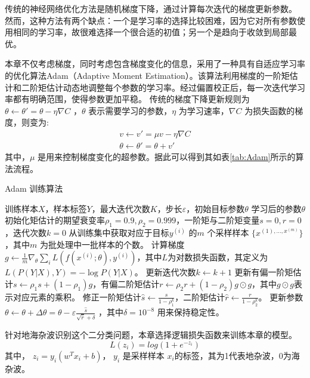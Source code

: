 传统的神经网络优化方法是随机梯度下降，通过计算每次迭代的梯度更新参数。
然而，这种方法有两个缺点：一个是学习率的选择比较困难，因为它对所有参数使用相同的学习率，故很难选择一个很合适的初值；另一个是趋向于收敛到局部最优。

本章不仅考虑梯度，同时考虑包含梯度变化的信息，采用了一种具有自适应学习率的优化算法Adam（Adaptive Moment Estimation）。该算法利用梯度的一阶矩估计和二阶矩估计动态地调整每个参数的学习率。经过偏置校正后，每一次迭代学习率都有明确范围，使得参数更加平稳。
传统的梯度下降更新规则为$\theta \leftarrow \theta'=\theta-\eta\nabla C$ ，$\theta$ 表示需要学习的参数，$\eta$ 为学习速率，$\nabla C$ 为损失函数的梯度，则变为:
\begin{align}
	v\leftarrow v'=\mu v - \eta \nabla C \\
	\theta \leftarrow \theta' = \theta +v'
\end{align}
其中，$\mu$ 是用来控制梯度变化的超参数。据此可以得到其如表\ref{tab:Adam}所示的算法流程。

\begin{algorithm}[hbt]
	\caption{Adam 训练算法}
	\label{tab:Adam}
	\begin{algorithmic}[1] %
		\Require 训练样本$X$，样本标签$Y$，最大迭代次数$K$，步长$\varepsilon$，初始目标参数$\theta$
		\Ensure 学习后的参数$\theta$
		\State 初始化矩估计的期望衰变率$\rho_1=0.9,\rho_2=0.999$，一阶矩与二阶矩变量$s=0,r=0$，迭代次数$k=0$
			\State 从训练集中获取对应于目标$y^{(i)}$ 的$m$ 个采样样本 $\{x^{(1),\dots,x^{(m)}}\}$ ，其中$m$ 为批处理中一批样本的个数。
			\label{line:start}
			\State 计算梯度$g \leftarrow \frac{1}{m} \nabla_{\theta} \sum_i L(f(x^{(i)};\theta), y^{(i)}) $，其中$L$为对数损失函数，其定义为$L(P(Y|X),Y) = - \log P(Y|X) $。
			\State 更新迭代次数$k \leftarrow k+1 $
			\State 更新有偏一阶矩估计$s \leftarrow \rho_1 s + (1 - \rho_1) g $，有偏二阶矩估计$r \leftarrow \rho_2 r + (1-\rho_2) g \odot g $，其中$ g \odot g $表示对应元素的乘积。
			\State 修正一阶矩估计$\hat{s} \leftarrow \frac{s}{1-\rho^k_1} $，二阶矩估计$\hat{r} \leftarrow \frac{r}{1-\rho^k_2} $。
			\State 更新参数 $\theta \leftarrow \theta + \Delta \theta = \theta - \varepsilon \frac{\hat{s}}{\sqrt{\hat{r}} + \delta} $
			，其中$\delta = 10^{-8} $
			用来保持稳定性。
		\EndWhile
	\end{algorithmic}
\end{algorithm}

针对地海杂波识别这个二分类问题，本章选择逻辑损失函数来训练本章的模型。
\begin{equation}
	L(z_i) = log(1+e^{-z_i})
\end{equation}
其中， $z_i=y_i(w^T x_i + b)$， $y_i$ 是采样样本 $x_i$的标签，其为1代表地杂波，0为海杂波。


